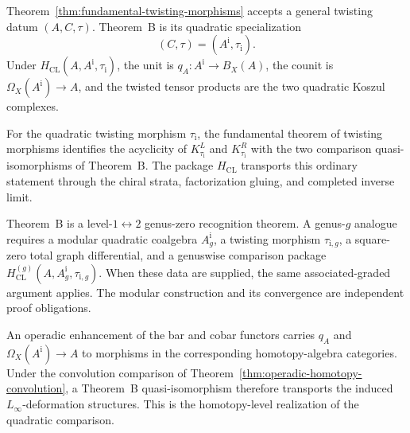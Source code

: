 \begin{remark}
\label{rem:inversion-vs-fundamental}
Theorem~\ref{thm:fundamental-twisting-morphisms} accepts a general
twisting datum \((A,C,\tau)\).  Theorem~B is its quadratic
specialization
\[
(C,\tau)=(A^{\mathrm i},\tau_{\mathrm i}).
\]
Under \(H_{\mathrm{CL}}(A,A^{\mathrm i},\tau_{\mathrm i})\), the unit
is \(q_A\colon A^{\mathrm i}\to B_X(A)\), the counit is
\(\Omega_X(A^{\mathrm i})\to A\), and the twisted tensor products are
the two quadratic Koszul complexes.
\end{remark}

\begin{remark}
\label{rem:bar-cobar-twisted-tensor-anchor}
For the quadratic twisting morphism \(\tau_{\mathrm i}\), the
fundamental theorem of twisting morphisms
\cite[Theorem~2.3.2]{LV12} identifies the acyclicity of
\(K^L_{\tau_{\mathrm i}}\) and \(K^R_{\tau_{\mathrm i}}\) with the two
comparison quasi-isomorphisms of Theorem~B.  The package
\(H_{\mathrm{CL}}\) transports this ordinary statement through the
chiral strata, factorization gluing, and completed inverse limit.
\end{remark}

\begin{remark}
\label{rem:higher-genus-mk3-conditionality}
Theorem~B is a level-\(1\leftrightarrow2\) genus-zero recognition
theorem.  A genus-\(g\) analogue requires a modular quadratic
coalgebra \(A_g^{\mathrm i}\), a twisting morphism
\(\tau_{\mathrm i,g}\), a square-zero total graph differential, and a
genuswise comparison package
\(H_{\mathrm{CL}}^{(g)}(A,A_g^{\mathrm i},\tau_{\mathrm i,g})\).
When these data are supplied, the same associated-graded argument
applies.  The modular construction and its convergence are independent
proof obligations.
\end{remark}

\begin{remark}
\label{rem:bar-cobar-inversion-linfty}
An operadic enhancement of the bar and cobar functors carries
\(q_A\) and \(\Omega_X(A^{\mathrm i})\to A\) to morphisms in the
corresponding homotopy-algebra categories.  Under the convolution
comparison of
Theorem~\ref{thm:operadic-homotopy-convolution}, a Theorem~B
quasi-isomorphism therefore transports the induced
\(L_\infty\)-deformation structures.  This is the homotopy-level
realization of the quadratic comparison.
\end{remark}

